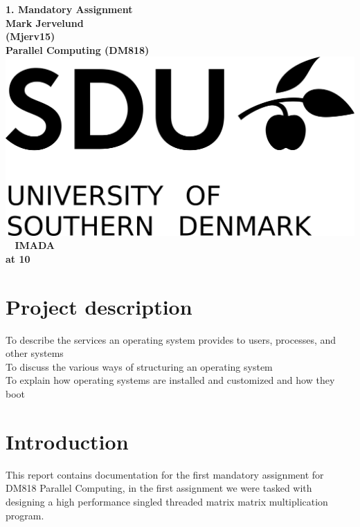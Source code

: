 \documentclass[a4paper,10pt,titlepage]{report}
\date{}
\begin{document}
\begin{titlepage}
\centering
    \vspace*{9\baselineskip}
    \huge
    \bfseries
    1. Mandatory Assignment \\
    \normalfont 
    Mark Jervelund  \\
    (Mjerv15) \\
	\huge    
    Parallel Computing (DM818)  \\[4\baselineskip]
    \normalfont
	\includegraphics[scale=1]{SDU_Logo}
    \vfill\ 
    \vspace{5mm}
    IMADA \\

    \textbf{\datedate}  \bf{at 10} \\[2\baselineskip]
\end{titlepage}

\renewcommand{\thepage}{\roman{page}}%
\tableofcontents
\newpage
\setcounter{page}{1}
\renewcommand{\thepage}{\arabic{page}}
\section{Project description}
To describe the services an operating system provides to
users, processes, and other systems\\
To discuss the various ways of structuring an operating
system\\
To explain how operating systems are installed and
customized and how they boot\\
\newpage

\section{Introduction}
This report contains documentation for the first mandatory assignment for DM818 Parallel Computing, in the first assignment we were tasked with designing a high performance singled threaded matrix matrix multiplication program.
\end{document}
